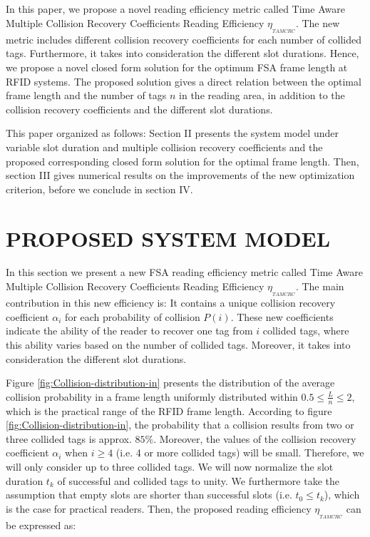 \documentclass[10pt,conference,letterpaper]{RWWTemplate}
\begin{document}
In this paper, we propose a novel reading efficiency metric called
Time Aware Multiple Collision Recovery Coefficients Reading Efficiency
$\eta_{_{TAMCRC}}$. The new metric includes different collision recovery
coefficients for each number of collided tags. Furthermore, it takes
into consideration the different slot durations. Hence, we propose
a novel closed form solution for the optimum FSA frame length at RFID
systems. The proposed solution gives a direct relation between the
optimal frame length and the number of tags $n$ in the reading area,
in addition to the collision recovery coefficients and the different
slot durations.

This paper organized as follows: Section II presents the system model
under variable slot duration and multiple collision recovery coefficients
and the proposed corresponding closed form solution for the optimal
frame length. Then, section III gives numerical results on the improvements
of the new optimization criterion, before we conclude in section IV. 


\section{PROPOSED SYSTEM MODEL }

In this section we present a new FSA reading efficiency metric called
Time Aware Multiple Collision Recovery Coefficients Reading Efficiency
$\eta_{_{TAMCRC}}$. The main contribution in this new efficiency
is: It contains a unique collision recovery coefficient $\alpha_{i}$
for each probability of collision $P(i)$. These new coefficients
indicate the ability of the reader to recover one tag from $i$ collided
tags, where this ability varies based on the number of collided tags.
Moreover, it takes into consideration the different slot durations. 

Figure \ref{fig:Collision-distribution-in} presents the distribution
of the average collision probability in a frame length uniformly distributed
within {\scriptsize{}$0.5\leq\frac{L}{n}\leq2$}, which is the practical
range of the RFID frame length. According to figure \ref{fig:Collision-distribution-in},
the probability that a collision results from two or three collided
tags is approx. $85\%$. Moreover, the values of the collision recovery
coefficient $\alpha_{i}$ when $i\geq4$ (i\@.e\@. 4 or more collided
tags) will be small. Therefore, we will only consider up to three
collided tags. We will now normalize the slot duration $t_{k}$ of
successful and collided tags to unity. We furthermore take the assumption
that empty slots are shorter than successful slots (i\@.e\@. $t_{0}\leq t_{k}$),
which is the case for practical readers. Then, the proposed reading
efficiency $\eta_{_{TAMCRC}}$ can be expressed as:
\end{document}
